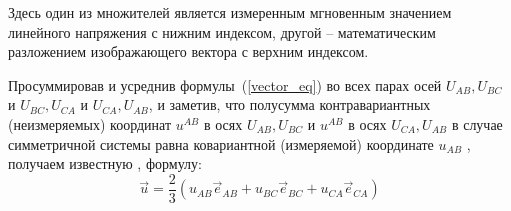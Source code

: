 Здесь один из множителей является измеренным мгновенным значением линейного напряжения с нижним индексом, другой -- математическим разложением изображающего вектора с верхним индексом.


Просуммировав и усреднив формулы~(\ref{vector_eq}) во всех парах осей $U_{\scriptstyle AB}, U_{\scriptstyle BC}$ и $U_{\scriptstyle BC}, U_{\scriptstyle CA}$ и 
$U_{\scriptstyle CA}, U_{\scriptstyle AB}$, и заметив, что полусумма контравариантных (неизмеряемых) координат $u^{\scriptscriptstyle AB} $ в осях $U_{\scriptstyle AB}, U_{\scriptstyle BC}$  
и %
$u^{\scriptscriptstyle AB} $ в осях $U_{\scriptstyle CA}, U_{\scriptstyle AB}$ в случае симметричной системы равна ковариантной (измеряемой) координате $u_{\scriptscriptstyle AB}$ \cite{Prokshin}, получаем
известную \cite{Gorev},\cite{Sokolovsky} формулу:
\begin{equation}
\vec{u} = \frac{2}{3} \left(
u_{\scriptscriptstyle\!AB} \vec{e}_{\scriptscriptstyle\!AB} + u_{\scriptscriptstyle\!BC} \vec{e}_{\scriptscriptstyle\!BC} + u_{\scriptscriptstyle\!CA} \vec{e}_{\scriptscriptstyle\!CA}
\right)
\label{park-gorev}
\end{equation}


